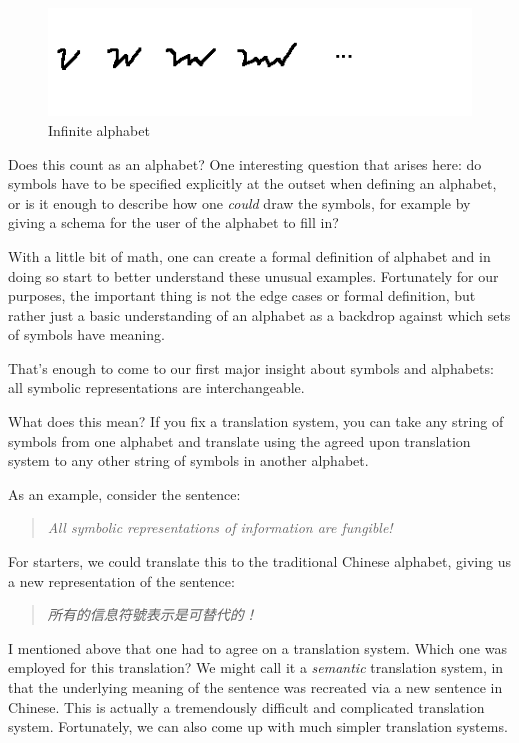 \documentclass[UTF8]{book}
\begin{document}
\begin{CJK}{UTF8}{gbsn}
\begin{figure}[H]
\centering
\includegraphics[width=0.8\linewidth]{infinite-alphabet}
\caption{Infinite alphabet}
\end{figure}

Does this count as an alphabet? One interesting question that arises here: do symbols have to be specified explicitly at the outset when defining an alphabet, or is it enough to describe how one \emph{could} draw the symbols, for example by giving a schema for the user of the alphabet to fill in?

With a little bit of math, one can create a formal definition of alphabet and in doing so start to better understand these unusual examples. Fortunately for our purposes, the important thing is not the edge cases or formal definition, but rather just a basic understanding of an alphabet as a backdrop against which sets of symbols have meaning.

That's enough to come to our first major insight about symbols and alphabets: all symbolic representations are interchangeable.

What does this mean? If you fix a translation system, you can take any string of symbols from one alphabet and translate using the agreed upon translation system to any other string of symbols in another alphabet.

As an example, consider the sentence:

\begin{quotation}
\centering
\emph{All symbolic representations of information are fungible!}
\end{quotation}

For starters, we could translate this to the traditional Chinese alphabet, giving us a new representation of the sentence:

\begin{quotation}
\centering
\emph{所有的信息符號表示是可替代的！}
\end{quotation}

I mentioned above that one had to agree on a translation system.  Which one was employed for this translation? We might call it a \emph{semantic} translation system, in that the underlying meaning of the sentence was recreated via a new sentence in Chinese. This is actually a tremendously difficult and complicated translation system. Fortunately, we can also come up with much simpler translation systems.


\end{CJK}
\end{document}
